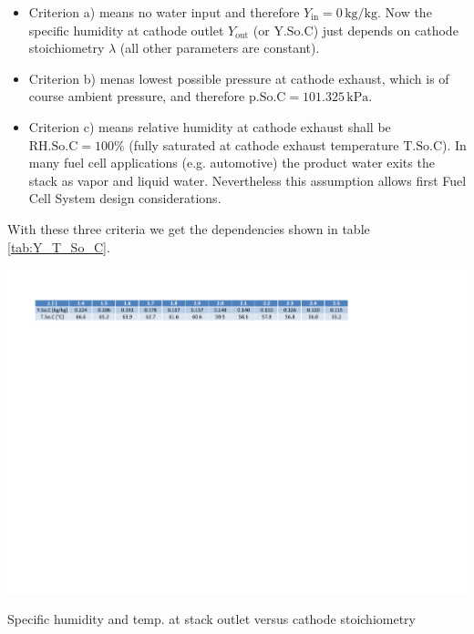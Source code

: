 \documentclass[11pt,a4paper,english,twoside]{scrreprt}
\begin{document}
\begin{itemize}
	\item Criterion a) means no water input and therefore $Y_\mathrm{in}=0\,\mathrm{kg/kg}$. Now the specific humidity at cathode outlet $Y_\mathrm{out}$ (or $\mathrm{Y.So.C}$) just depends on cathode stoichiometry $\lambda$ (all other parameters are constant). 

  \item Criterion b) menas lowest possible pressure at cathode exhaust, which is of course ambient pressure, and therefore $\mathrm{p.So.C}=101.325\,\mathrm{kPa}$.

  \item Criterion c) means relative humidity at cathode exhaust shall be $\mathrm{RH.So.C} = 100\%$ (fully saturated at cathode exhaust temperature $\mathrm{T.So.C}$). In many fuel cell applications (e.g. automotive) the product water exits the stack as vapor and liquid water. Nevertheless this assumption allows first Fuel Cell System design considerations.

\end{itemize}

With these three criteria we get the dependencies shown in table \ref{tab:Y_T_So_C}. 

\begin{table}
  \centering
  \includegraphics*[width=\textwidth,angle=0]{FCF_Table_Y_T_So_C.pdf}
  \caption[Specific humidity and temp. at stack outlet versus cathode stoichiometry]{Specific humidity and temp. at stack outlet versus cathode stoichiometry}
  \label{tab:Y_T_So_C}
\end{table}
\end{document}
